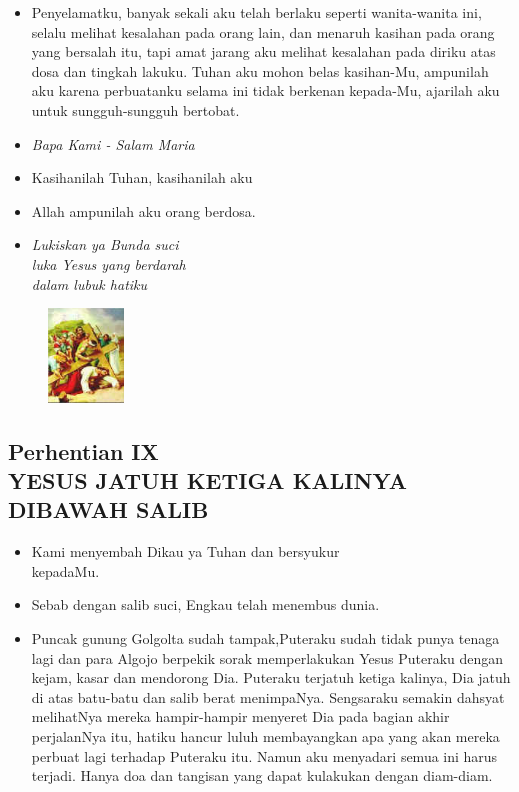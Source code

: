 \documentclass[a5paper,headsepline,titlepage,10pt,nnormalheadings,DIVcalc]{scrbook}
\newcommand{\BU}[1]{\begin{itemize} \item[U:] #1 \end{itemize}}
\newcommand{\BP}[1]{\begin{itemize} \item[P:] #1 \end{itemize}}
\begin{document}
\BU{Penyelamatku, banyak  sekali  aku  telah berlaku seperti wanita-wanita ini, selalu melihat kesalahan pada orang lain, dan menaruh kasihan pada orang yang bersalah itu, tapi amat jarang aku melihat kesalahan pada diriku atas dosa dan tingkah lakuku. Tuhan aku mohon belas kasihan-Mu, ampunilah aku karena perbuatanku selama ini tidak berkenan kepada-Mu, ajarilah aku untuk sungguh-sungguh bertobat.}

\large\begin{itemize}\item[~]\it{Bapa Kami - Salam Maria}\end{itemize}\normalsize
\BP{Kasihanilah Tuhan, kasihanilah aku}
   \BU{Allah ampunilah aku orang berdosa.}

\begin{itemize}
\item[8.] \it{Lukiskan ya Bunda suci\\luka Yesus yang berdarah\\
    dalam lubuk hatiku
}\end{itemize}

\begin{figure}
\includegraphics[width=2cm]{jalansalib_files/09_small.jpg}
\end{figure}
\subsection*{Perhentian IX\\
YESUS JATUH KETIGA KALINYA DIBAWAH SALIB}

\BP{    Kami menyembah Dikau ya Tuhan dan bersyukur\\kepadaMu.}
\BU{   Sebab dengan salib suci, Engkau telah menembus dunia.}

\BP{Puncak  gunung  Golgolta  sudah  tampak,Puteraku sudah tidak punya tenaga lagi dan para Algojo berpekik sorak memperlakukan Yesus Puteraku dengan kejam, kasar dan mendorong Dia. Puteraku terjatuh ketiga kalinya, Dia jatuh di atas batu-batu dan salib berat menimpaNya. Sengsaraku semakin dahsyat melihatNya mereka hampir-hampir menyeret Dia pada bagian akhir perjalanNya itu, hatiku hancur luluh membayangkan apa yang akan mereka perbuat lagi terhadap Puteraku itu. Namun aku menyadari semua ini harus terjadi. Hanya doa dan tangisan yang dapat kulakukan dengan diam-diam.}
\end{document}

